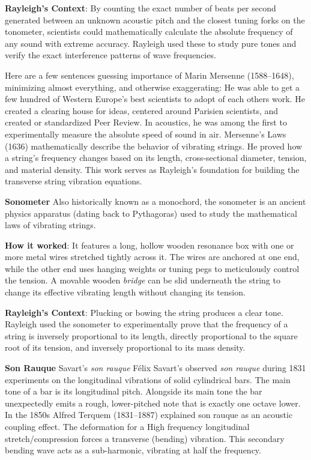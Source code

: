 \textbf{Rayleigh's Context}: By counting the exact number of beats per
second generated between an unknown acoustic pitch and the closest
tuning forks on the tonometer, scientists could mathematically calculate
the absolute frequency of any sound with extreme accuracy. Rayleigh used
these to study pure tones and verify the exact interference patterns of
wave frequencies.

Here are a few sentences guessing importance of Marin Mersenne
(1588--1648), minimizing almost everything, and otherwise exaggerating: He was
able to get a few hundred of Western Europe's best scientists to adopt
of each others work. He created a clearing house for ideas, centered
around Parisien scientists, and created or standardized Peer Review. In
acoustics, he was among the first to experimentally measure the absolute
speed of sound in air. Mersenne's Laws (1636) mathematically describe
the behavior of vibrating strings. He proved how a string's frequency
changes based on its length, cross-sectional diameter, tension, and
material density. This work serves as Rayleigh's foundation for building
the transverse string vibration equations.

\textbf{Sonometer} Also historically known as a monochord, the sonometer is an
ancient physics apparatus (dating back to Pythagoras) used to study the
mathematical laws of vibrating strings.

\textbf{How it worked}: It features a long, hollow wooden resonance box with one
or more metal wires stretched tightly across it. The wires are anchored
at one end, while the other end uses hanging weights or tuning pegs to
meticulously control the tension. A movable wooden \textit{bridge} can be slid
underneath the string to change its effective vibrating length without
changing its tension.

\textbf{Rayleigh's Context}: Plucking or bowing the string produces a clear tone.
Rayleigh used the sonometer to experimentally prove that the frequency
of a string is inversely proportional to its length, directly
proportional to the square root of its tension, and inversely
proportional to its mass density.

\textbf{Son Rauque}
Savart's \emph{son rauque} F{é}lix Savart's observed \emph{son rauque}
during 1831 experiments on the longitudinal vibrations of solid
cylindrical bars. The main tone of a bar is its longitudinal pitch.
Alongside its main tone the bar unexpectedly emits a rough,
lower-pitched note that is exactly one octave lower. In the 1850s Alfred
Terquem (1831--1887) explained son rauque as an acoustic coupling
effect. The deformation for a High frequency longitudinal
stretch/compression forces a transverse (bending) vibration. This
secondary bending wave acts as a sub-harmonic, vibrating at half the
frequency.

